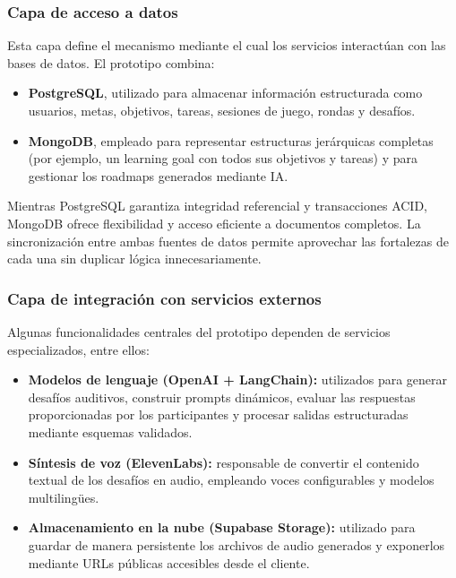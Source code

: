 \subsubsection{Capa de acceso a datos}
Esta capa define el mecanismo mediante el cual los servicios interactúan con las bases de datos. El prototipo combina:

\begin{itemize}
    \item \textbf{PostgreSQL}, utilizado para almacenar información estructurada como usuarios, metas, objetivos, tareas, sesiones de juego, rondas y desafíos.
    \item \textbf{MongoDB}, empleado para representar estructuras jerárquicas completas (por ejemplo, un learning goal con todos sus objetivos y tareas) y para gestionar los roadmaps generados mediante IA.
\end{itemize}

Mientras PostgreSQL garantiza integridad referencial y transacciones ACID, MongoDB ofrece flexibilidad y acceso eficiente a documentos completos. La sincronización entre ambas fuentes de datos permite aprovechar las fortalezas de cada una sin duplicar lógica innecesariamente.

\subsubsection{Capa de integración con servicios externos}
Algunas funcionalidades centrales del prototipo dependen de servicios especializados, entre ellos:

\begin{itemize}
    \item \textbf{Modelos de lenguaje (OpenAI + LangChain):} utilizados para generar desafíos auditivos, construir prompts dinámicos, evaluar las respuestas proporcionadas por los participantes y procesar salidas estructuradas mediante esquemas validados.

    \item \textbf{Síntesis de voz (ElevenLabs):} responsable de convertir el contenido textual de los desafíos en audio, empleando voces configurables y modelos multilingües.

    \item \textbf{Almacenamiento en la nube (Supabase Storage):} utilizado para guardar de manera persistente los archivos de audio generados y exponerlos mediante URLs públicas accesibles desde el cliente.
\end{itemize}

